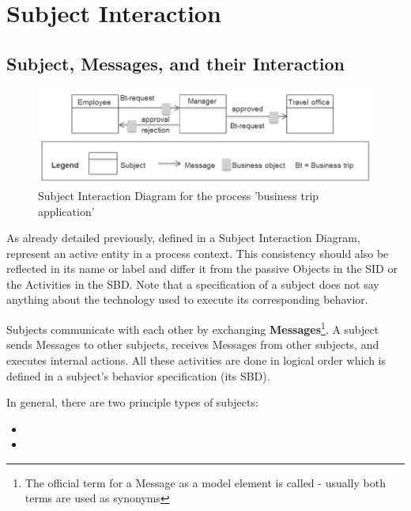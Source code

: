 \section{Subject Interaction}
\label{sec:subjectInteraction}

\subsection{Subject, Messages, and their Interaction}
\label{sec: Subject}


\begin{figure}[htbp]
	\centering
	\includegraphics[width=14cm]{Figures/Ontology/SubjectInteraction/Beispiel-Subject-Interaction.png}
	\caption[Subject Interaction Diagram]{Subject Interaction Diagram for the process 'business trip application'}
	\label{fig:beispiel-SubjectInteraction}
\end{figure}

As already detailed previously,  defined in a Subject Interaction Diagram, represent an active entity in a process context. This consistency should also be reflected in its name or label and differ it from the passive Objects in the SID or the Activities in the SBD. Note that a specification of a subject does not say anything about the technology used to execute its corresponding behavior. 

Subjects communicate with each other by exchanging \textbf{Messages}\footnote{The official term for a Message as a model element is called  - usually both terms are used as synonyms}. A subject sends Messages to other subjects, receives Messages from other subjects, and executes internal actions. All these activities are done in logical order which is defined in a subject's behavior specification (its SBD).

In general, there are two principle types of subjects:

\begin{itemize}
	\item {}
	\item {}
\end{itemize}

